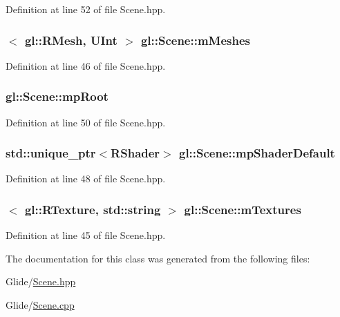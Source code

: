 Definition at line 52 of file Scene.\-hpp.

\hypertarget{classgl_1_1_scene_a4005eea9240f83937897af8798c413c7}{
\subsubsection[{m\-Meshes}]{$<$ {\bf gl\-::\-R\-Mesh}, {\bf U\-Int} $>$ gl\-::\-Scene\-::m\-Meshes\hspace{0.3cm}{\ttfamily [protected]}}}\label{classgl_1_1_scene_a4005eea9240f83937897af8798c413c7}


Definition at line 46 of file Scene.\-hpp.

\hypertarget{classgl_1_1_scene_aaec3924a3fe960cebf42483f8cf163ed}{
\subsubsection[{mp\-Root}]{ gl\-::\-Scene\-::mp\-Root\hspace{0.3cm}{\ttfamily [protected]}}}\label{classgl_1_1_scene_aaec3924a3fe960cebf42483f8cf163ed}


Definition at line 50 of file Scene.\-hpp.

\hypertarget{classgl_1_1_scene_a8480592c3885010d88253bfcc04d54a0}{
\subsubsection[{mp\-Shader\-Default}]{\setlength{\rightskip}{0pt plus 5cm}std\-::unique\-\_\-ptr$<${\bf R\-Shader}$>$ gl\-::\-Scene\-::mp\-Shader\-Default\hspace{0.3cm}{\ttfamily [protected]}}}\label{classgl_1_1_scene_a8480592c3885010d88253bfcc04d54a0}


Definition at line 48 of file Scene.\-hpp.

\hypertarget{classgl_1_1_scene_a73712112854dd06b3fe837acac4edd26}{
\subsubsection[{m\-Textures}]{$<$ {\bf gl\-::\-R\-Texture}, std\-::string $>$ gl\-::\-Scene\-::m\-Textures\hspace{0.3cm}{\ttfamily [protected]}}}\label{classgl_1_1_scene_a73712112854dd06b3fe837acac4edd26}


Definition at line 45 of file Scene.\-hpp.



The documentation for this class was generated from the following files\-:\begin{DoxyCompactItemize}
\item 
Glide/\hyperlink{_scene_8hpp}{Scene.\-hpp}\item 
Glide/\hyperlink{_scene_8cpp}{Scene.\-cpp}\end{DoxyCompactItemize}
